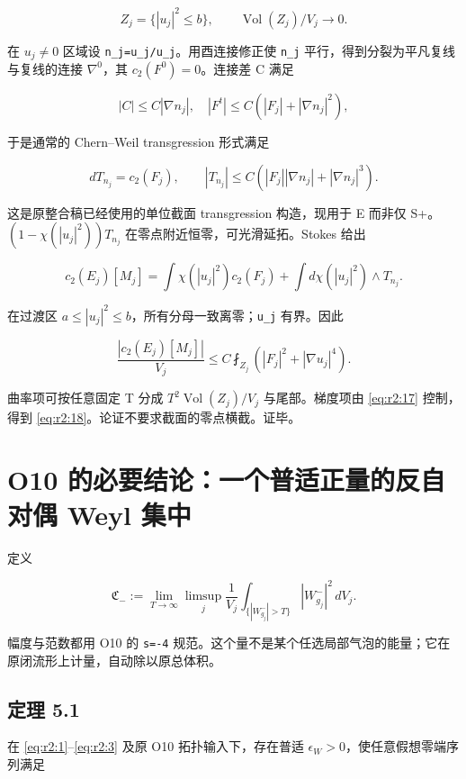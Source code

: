 \documentclass[UTF8,11pt,fontset=none]{ctexart}
\begin{document}
\[
 Z_j=\{|u_j|^2\le b\},\qquad \operatorname{Vol}(Z_j)/V_j\to0.
\]

在 \(u_j\ne0\) 区域设 \texttt{n\_j=u\_j/\textbar{}u\_j\textbar{}}。用酉连接修正使 \texttt{n\_j} 平行，得到分裂为平凡复线与复线的连接 \(\nabla^0\)，其 \(c_2(F^0)=0\)。连接差 C 满足

\[
 |C|\le C|\nabla n_j|,\quad
 |F^t|\le C(|F_j|+|\nabla n_j|^2),
\]

于是通常的 Chern--Weil transgression 形式满足

\[
 dT_{n_j}=c_2(F_j),\qquad
 |T_{n_j}|\le C\left(|F_j||\nabla n_j|+|\nabla n_j|^3\right).
 \tag{2.19}\label{eq:r2:19}
\]

这是原整合稿已经使用的单位截面 transgression 构造，现用于 E 而非仅 S+。\((1-\chi(|u_j|^2))T_{n_j}\) 在零点附近恒零，可光滑延拓。Stokes 给出

\[
 c_2(E_j)[M_j]
 =\int\chi(|u_j|^2)c_2(F_j)
 +\int d\chi(|u_j|^2)\wedge T_{n_j}.
 \tag{2.20}\label{eq:r2:20}
\]

在过渡区 \(a\le|u_j|^2\le b\)，所有分母一致离零；\texttt{\textbar{}u\_j\textbar{}} 有界。因此

\[
 \frac{|c_2(E_j)[M_j]|}{V_j}
 \le C\fint_{Z_j}\left(|F_j|^2+|\nabla u_j|^4\right).
 \tag{2.21}\label{eq:r2:21}
\]

曲率项可按任意固定 T 分成 \(T^2\operatorname{Vol}(Z_j)/V_j\) 与尾部。梯度项由 \eqref{eq:r2:17} 控制，得到 \eqref{eq:r2:18}。论证不要求截面的零点横截。证毕。

\section{O10 的必要结论：一个普适正量的反自对偶 Weyl 集中}\label{ch2:o10-ux7684ux5fc5ux8981ux7ed3ux8bbaux4e00ux4e2aux666eux9002ux6b63ux91cfux7684ux53cdux81eaux5bf9ux5076-weyl-ux96c6ux4e2d}

定义

\[
 \mathfrak C_-:=\lim_{T\to\infty}\limsup_j
 \frac1{V_j}\int_{\{|W^-_{g_j}|>T\}}|W^-_{g_j}|^2\,dV_j.
 \tag{2.22}\label{eq:r2:22}
\]

幅度与范数都用 O10 的 \texttt{s=-4} 规范。这个量不是某个任选局部气泡的能量；它在原闭流形上计量，自动除以原总体积。

\subsection{定理 5.1}\label{ch2:ux5b9aux7406-5.1}

在 \eqref{eq:r2:1}--\eqref{eq:r2:3} 及原 O10 拓扑输入下，存在普适 \(\epsilon_W>0\)，使任意假想零端序列满足
\end{document}
